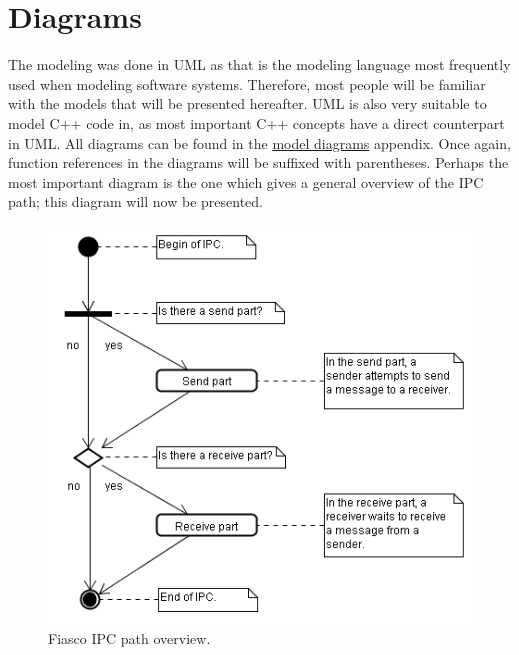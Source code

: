 \section{Diagrams}
The modeling was done in UML \cite{larman04applying} as that is the modeling language most frequently used when modeling software systems. Therefore, most people will be familiar with the models that will be presented hereafter. UML is also very suitable to model C++ code in, as most important C++ concepts have a direct counterpart in UML. All diagrams can be found in the \hyperlink{model_diagrams}{model diagrams} appendix. Once again, function references in the diagrams will be suffixed with parentheses. Perhaps the most important diagram is the one which gives a general overview of the IPC path; this diagram will now be presented.

\begin{figure}[ht]
\includegraphics[scale=0.50]{images/diagrams/ipc_activity_ipc_overview}
\caption{Fiasco IPC path overview.}
\end{figure}